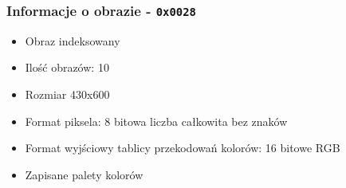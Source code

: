 \begin{frame}
  \frametitle{Informacje o obrazie - \texttt{0x0028}}
\begin{itemize}
  \item Obraz indeksowany
  \item Ilość obrazów: 10
  \item Rozmiar 430x600
  \item Format piksela: 8 bitowa liczba całkowita bez znaków
  \item Format wyjściowy tablicy przekodowań kolorów: 16 bitowe RGB
  \item Zapisane palety kolorów
\end{itemize}
\end{frame}
